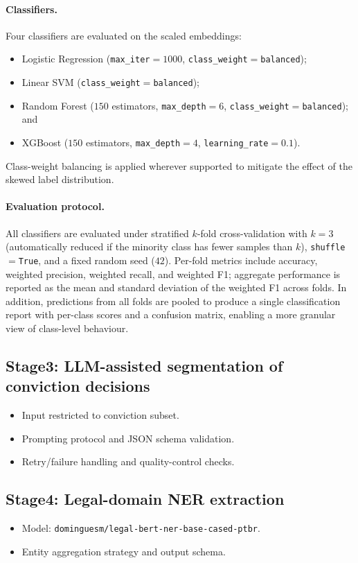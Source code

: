 \documentclass[preprint,a4paper,fleqn]{cas-dc}
\begin{document}
\paragraph{Classifiers.}
Four classifiers are evaluated on the scaled embeddings:
\begin{itemize}
    \item Logistic Regression (\texttt{max\_iter}$=1000$, \texttt{class\_weight}$=$\texttt{balanced});
    \item Linear SVM (\texttt{class\_weight}$=$\texttt{balanced});
    \item Random Forest ($150$ estimators, \texttt{max\_depth}$=6$, \texttt{class\_weight}$=$\texttt{balanced}); and
    \item XGBoost ($150$ estimators, \texttt{max\_depth}$=4$, \texttt{learning\_rate}$=0.1$).
\end{itemize}
Class-weight balancing is applied wherever supported to mitigate the effect of the skewed label distribution.

\paragraph{Evaluation protocol.}
All classifiers are evaluated under stratified $k$-fold cross-validation with $k=3$ (automatically reduced if the minority class has fewer samples than $k$), \texttt{shuffle}$=$\texttt{True}, and a fixed random seed ($42$). Per-fold metrics include accuracy, weighted precision, weighted recall, and weighted F1; aggregate performance is reported as the mean and standard deviation of the weighted F1 across folds. In addition, predictions from all folds are pooled to produce a single classification report with per-class scores and a confusion matrix, enabling a more granular view of class-level behaviour.

\subsection{Stage3: LLM-assisted segmentation of conviction decisions}
\begin{itemize}
    \item Input restricted to conviction subset.
    \item Prompting protocol and JSON schema validation.
    \item Retry/failure handling and quality-control checks.
\end{itemize}

\subsection{Stage4: Legal-domain NER extraction}
\begin{itemize}
    \item Model: \texttt{dominguesm/legal-bert-ner-base-cased-ptbr}.
    \item Entity aggregation strategy and output schema.
\end{itemize}
\end{document}
